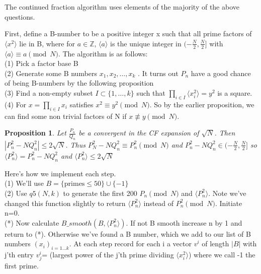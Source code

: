 \documentclass[10pt,a4paper]{report}
\newtheorem*{prop}{Proposition}
\begin{document}
The continued fraction algorithm uses elements of the majority of the above questions. 

First, define a B-number to be a positive integer x such that all prime factors of $\langle x^2 \rangle$ lie in B, where for $a\in\mathbb{Z}$, $\langle a \rangle$ is the unique integer in $(-\frac{N}{2}, \frac{N}{2}]$ with $\langle a \rangle \equiv a \pmod N$. The algorithm is as follows:\\

(1) Pick a factor base B\\
(2) Generate some B numbers $x_1, x_2, \dots, x_k$ . It turns out $P_n$ have a good chance of being B-numbers by the following proposition\\
(3) Find a non-empty subset $I\subset\{1, \dots ,k\}$ such that $\prod_{i\in I}\langle x_i^2 \rangle=y^2$ is a square.\\
(4) For $x=\prod_{i\in I}x_i$ satisfies $x^2\equiv y^2 \pmod N$. So by the earlier proposition, we can find some non trivial factors of N if $x\not\equiv y \pmod N$. \\

\begin{prop}
Let $\frac{P_n}{Q_n}$ be a convergent in the CF expansion of $\sqrt{N}$. Then $|P_n^2-NQ_n^2|\leq2\sqrt{N}$. Thus $P_N^2-NQ_n^2 \equiv P_n^2 \pmod N$ and $P_n^2-NQ_n^2 \in (-\frac{N}{2}, \frac{N}{2}]$ so $\langle P_n^2\rangle = P_n^2-NQ_n^2$ and $\langle P_n^2\rangle\leq2\sqrt{N}$
\end{prop}

Here's how we implement each step.\\

(1) We'll use $B=\{\text{primes}\leq 50\} \cup \{-1\}$\\

(2) Use $q5(N,k)$ to generate the first 200 $P_n \pmod N$ and $\langle P_n^2 \rangle$. Note we've changed this function slightly to return 
 $\langle P_n^2 \rangle$ instead of $P_n^2 \pmod N$. Initiate n=0.\\

(*) Now calculate $B\_smooth(B, \langle P_n^2 \rangle)$. If not B smooth increase n by 1 and return to (*). Otherwise we've found a B number, which we add to our list of B numbers $(x_i)_{i=1\dots k}$. At each step record for each i a vector  $v^{i}$ of length $|B|$ with j'th entry $v^{i}_j$= (largest power of the j'th prime dividing $\langle x_i^2 \rangle$) where we call -1 the first prime.\\
 
\end{document}

